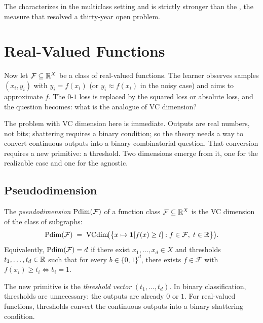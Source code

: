 The  characterizes  in the multiclass
setting and is strictly stronger than the , the measure
that resolved a thirty-year open problem.



\section{Real-Valued Functions}
\label{sec:real-valued}

Now let $\mathcal{F} \subseteq \mathbb{R}^X$ be a class of real-valued functions.
The learner observes samples $(x_i, y_i)$ with $y_i = f(x_i)$ (or
$y_i \approx f(x_i)$ in the noisy case) and aims to approximate $f$.
The $0$-$1$ loss is replaced by the squared loss or absolute loss, and the
question becomes: what is the analogue of VC dimension?

The problem with VC dimension here is immediate.  Outputs are real numbers,
not bits; shattering requires a binary condition; so the theory needs a way
to convert continuous outputs into a binary combinatorial question.  That
conversion requires a new primitive: a threshold.  Two dimensions emerge from
it, one for the realizable case and one for the agnostic.


\subsection{Pseudodimension}

\begin{defn}
\label{def:pseudodim-ext}
The \emph{pseudodimension} $\mathrm{Pdim}(\mathcal{F})$ of a function class
$\mathcal{F} \subseteq \mathbb{R}^X$ is the VC dimension of the class of subgraphs:
\[
  \mathrm{Pdim}(\mathcal{F}) \;=\; \mathrm{VCdim}\!\bigl(\bigl\{
    x \mapsto \mathbf{1}[f(x) \geq t] : f \in \mathcal{F},\; t \in \mathbb{R}
  \bigr\}\bigr).
\]
Equivalently, $\mathrm{Pdim}(\mathcal{F}) = d$ if there exist $x_1, \ldots, x_d \in X$
and thresholds $t_1, \ldots, t_d \in \mathbb{R}$ such that for every
$b \in \{0,1\}^d$, there exists $f \in \mathcal{F}$ with
$f(x_i) \geq t_i \iff b_i = 1$.
\end{defn}

The new primitive is the \emph{threshold vector} $(t_1, \ldots, t_d)$.
In binary classification, thresholds are unnecessary: the outputs are
already $0$ or $1$.  For real-valued functions, thresholds convert the
continuous outputs into a binary shattering condition.

